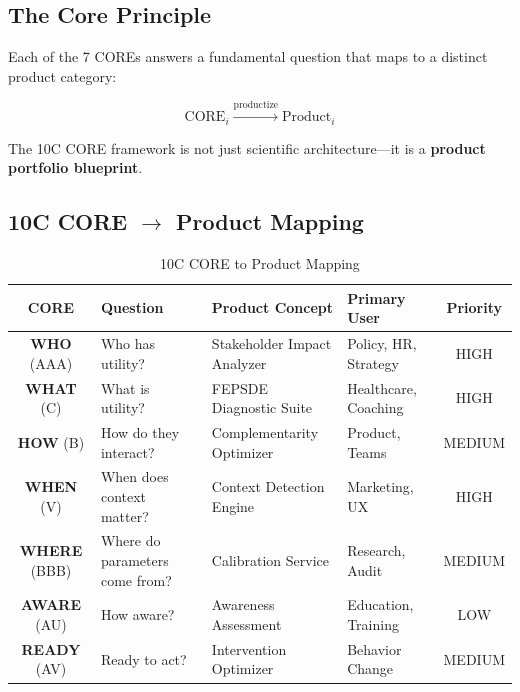 \subsection{The Core Principle}

Each of the 7 COREs answers a fundamental question that maps to a distinct product category:

\begin{equation}
\text{CORE}_i \xrightarrow{\text{productize}} \text{Product}_i
\end{equation}

The 10C CORE framework is not just scientific architecture---it is a \textbf{product portfolio blueprint}.


\subsection{10C CORE $\to$ Product Mapping}

\begin{table}[htbp]
\centering
\caption{10C CORE to Product Mapping}
\label{tab:vvv-7c-products}
\renewcommand{\arraystretch}{1.4}
\begin{tabular}{@{}clp{4cm}p{3cm}c@{}}
\toprule
\textbf{CORE} & \textbf{Question} & \textbf{Product Concept} & \textbf{Primary User} & \textbf{Priority} \\
\midrule
\textbf{WHO} (AAA) & Who has utility? & Stakeholder Impact Analyzer & Policy, HR, Strategy & HIGH \\
\textbf{WHAT} (C) & What is utility? & FEPSDE Diagnostic Suite & Healthcare, Coaching & HIGH \\
\textbf{HOW} (B) & How do they interact? & Complementarity Optimizer & Product, Teams & MEDIUM \\
\textbf{WHEN} (V) & When does context matter? & Context Detection Engine & Marketing, UX & HIGH \\
\textbf{WHERE} (BBB) & Where do parameters come from? & Calibration Service & Research, Audit & MEDIUM \\
\textbf{AWARE} (AU) & How aware? & Awareness Assessment & Education, Training & LOW \\
\textbf{READY} (AV) & Ready to act? & Intervention Optimizer & Behavior Change & MEDIUM \\
\bottomrule
\end{tabular}
\end{table}



